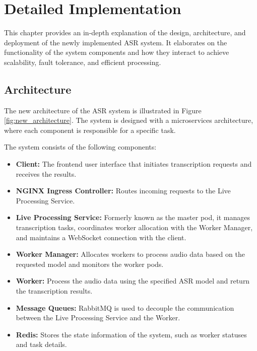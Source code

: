 \chapter{Detailed Implementation} \label{chapter:detailed_implementation}
This chapter provides an in-depth explanation of the design, architecture, and deployment of the newly implemented ASR system. It elaborates on the functionality of the system components and how they interact to achieve scalability, fault tolerance, and efficient processing.

\section{Architecture}
The new architecture of the ASR system is illustrated in Figure \ref{fig:new_architecture}. The system is designed with a microservices architecture, where each component is responsible for a specific task. 

The system consists of the following components:
\begin{itemize}
    \item \textbf{Client:} The frontend user interface that initiates transcription requests and receives the results.
    \item \textbf{NGINX Ingress Controller:} Routes incoming requests to the Live Processing Service.
    \item \textbf{Live Processing Service:} Formerly known as the master pod, it manages transcription tasks, coordinates worker allocation with the Worker Manager, and maintains a WebSocket connection with the client.
    \item \textbf{Worker Manager:} Allocates workers to process audio data based on the requested model and monitors the worker pods.
    \item \textbf{Worker:} Process the audio data using the specified ASR model and return the transcription results.
    \item \textbf{Message Queues:} RabbitMQ is used to decouple the communication between the Live Processing Service and the Worker.
    \item \textbf{Redis:} Stores the state information of the system, such as worker statuses and task details.
\end{itemize}

